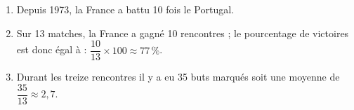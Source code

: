 \begin{enumerate}
\item %
Depuis 1973, la France a battu 10 fois le Portugal.
\item %
Sur 13 matches, la France a gagné 10 rencontres ; le pourcentage de victoires est donc égal à : $\dfrac{10}{13} \times 100 \approx 77\,\%$.
\item %
Durant les treize rencontres il y a eu 35 buts marqués soit une moyenne de $\dfrac{35}{13} \approx 2,7$.
\end{enumerate}

\bigskip

